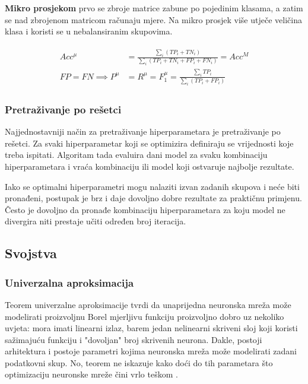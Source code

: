 \documentclass[times, utf8, numeric, diplomski]{fer}
\begin{document}
\textbf{Mikro prosjekom} prvo se zbroje matrice zabune po pojedinim klasama, a zatim se nad zbrojenom matricom računaju mjere. Na mikro prosjek više utječe veličina klasa i koristi se u nebalansiranim skupovima.

\begin{align}
\begin{split}
Acc^\mu &= \frac{\sum_i (TP_i+TN_i)}{\sum_i (TP_i+TN_i+FP_i+FN_i)} = Acc^M \\
FP = FN \implies P^\mu &= R^\mu = F_1^\mu = \frac{\sum_i TP_i}{\sum_i (TP_i+FP_i)}
\end{split}
\end{align}

\subsubsection{Pretraživanje po rešetci}
\label{sec:grid_search}
Najjednostavniji način za pretraživanje hiperparametara je pretraživanje po rešetci. Za svaki hiperparametar koji se optimizira definiraju se vrijednosti koje treba ispitati. Algoritam tada evaluira dani model za svaku kombinaciju hiperparametara i vraća kombinaciju ili model koji ostvaruje najbolje rezultate.

Iako se optimalni hiperparametri mogu nalaziti izvan zadanih skupova i neće biti pronađeni, postupak je brz i daje dovoljno dobre rezultate za praktičnu primjenu. Često je dovoljno da pronađe kombinaciju hiperparametara za koju model ne divergira niti prestaje učiti određen broj iteracija.

\subsection{Svojstva}
\label{sec:svojstva}

\subsubsection{Univerzalna aproksimacija}
Teorem univerzalne aproksimacije tvrdi da unaprijedna neuronska mreža može modelirati proizvoljnu Borel mjerljivu funkciju proizvoljno dobro uz nekoliko uvjeta: mora imati linearni izlaz, barem jedan nelinearni skriveni sloj koji koristi sažimajuću funkciju i "dovoljan" broj skrivenih neurona. Dakle, postoji arhitektura i postoje parametri kojima neuronska mreža može modelirati zadani podatkovni skup. No, teorem ne iskazuje kako doći do tih parametara što optimizaciju neuronske mreže čini vrlo teškom \citep{goodfellowbook}. 
\end{document}
